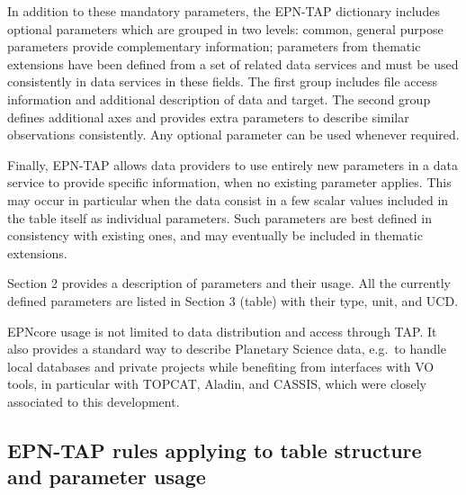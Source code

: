 \documentclass[11pt,a4paper]{ivoa}
\begin{document}
In addition to these mandatory parameters, the EPN-TAP dictionary includes
optional parameters which are grouped in two levels: common, general
purpose parameters provide complementary information; parameters from
thematic extensions have been defined from a set of related data services
and must be used consistently in data services in these fields. The first
group includes file access information and additional description of data
and target. The second group defines additional axes and provides extra
parameters to describe similar observations consistently. Any optional
parameter can be used whenever required.

Finally, EPN-TAP allows data providers to use entirely new parameters in a
data service to provide specific information, when no existing parameter
applies. This may occur in particular when the data consist in a few
scalar values included in the table itself as individual parameters. Such
parameters are best defined in consistency with existing ones, and may
eventually be included in thematic extensions.

Section 2 provides a description of parameters and their usage. All the
currently defined parameters are listed in Section 3 (table) with their
type, unit, and UCD.

EPNcore usage is not limited to data distribution and access through
TAP. It also provides a standard way to describe Planetary Science data,
e.g.\ to handle local databases and private projects while benefiting
from interfaces with VO tools, in particular with TOPCAT, Aladin, and
CASSIS, which were closely associated to this development.

\subsection{EPN-TAP rules applying to table structure and parameter usage}
\end{document}
